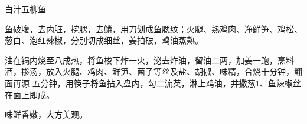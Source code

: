 \begin{recipe}{白汁五柳鱼}

\ingredients


\preparation

\step 鱼破腹，去内脏，挖腮，去鱗，用刀划成鱼腮纹；火腿、熟鸡肉、净鲜笋、鸡松、
葱白、泡红辣椒，分别切成细丝，姜拍破，鸡油蒸熟。

\step 油在锅内烧至八成热，将鱼梭下炸一火，泌去炸油，留油二两，加姜一跑，烹料
酒，掺汤，放入火腿、鸡肉、鲜笋、菌子等丝及盐、胡俶、味精，合烧十分钟，翻面再源
五分钟，用筷子将鱼拈入盘内，勾二流芡，淋上鸡油，并撒葱1、鱼辣椒丝在面上即成。

\features

味鲜香嫩，大方美观。

\end{recipe}

